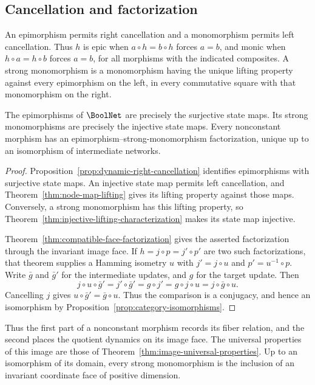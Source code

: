 \subsection{Cancellation and factorization}\label{subsec:category-factorization}

An epimorphism permits right cancellation and a monomorphism permits left cancellation. Thus $h$ is epic when $a\circ h=b\circ h$ forces $a=b$, and monic when $h\circ a=h\circ b$ forces $a=b$, for all morphisms with the indicated composites. A strong monomorphism is a monomorphism having the unique lifting property against every epimorphism on the left, in every commutative square with that monomorphism on the right.

\begin{theorem}\label{thm:category-cancellation}
The epimorphisms of $\BoolNet$ are precisely the surjective state maps. Its strong monomorphisms are precisely the injective state maps. Every nonconstant morphism has an epimorphism--strong-monomorphism factorization, unique up to an isomorphism of intermediate networks.
\end{theorem}

\begin{proof}
Proposition~\ref{prop:dynamic-right-cancellation} identifies epimorphisms with surjective state maps. An injective state map permits left cancellation, and Theorem~\ref{thm:node-map-lifting} gives its lifting property against those maps. Conversely, a strong monomorphism has this lifting property, so Theorem~\ref{thm:injective-lifting-characterization} makes its state map injective.

Theorem~\ref{thm:compatible-face-factorization} gives the asserted factorization through the invariant image face. If $h=j\circ p=j'\circ p'$ are two such factorizations, that theorem supplies a Hamming isometry $u$ with $j'=j\circ u$ and $p'=u^{-1}\circ p$. Write $\bar g$ and $\bar g'$ for the intermediate updates, and $g$ for the target update. Then
\[
    j\circ u\circ\bar g'=j'\circ\bar g'
    =g\circ j'=g\circ j\circ u=j\circ\bar g\circ u.
\]
Cancelling $j$ gives $u\circ\bar g'=\bar g\circ u$. Thus the comparison is a conjugacy, and hence an isomorphism by Proposition~\ref{prop:category-isomorphisms}.
\end{proof}

Thus the first part of a nonconstant morphism records its fiber relation, and the second places the quotient dynamics on its image face. The universal properties of this image are those of Theorem~\ref{thm:image-universal-properties}. Up to an isomorphism of its domain, every strong monomorphism is the inclusion of an invariant coordinate face of positive dimension.

